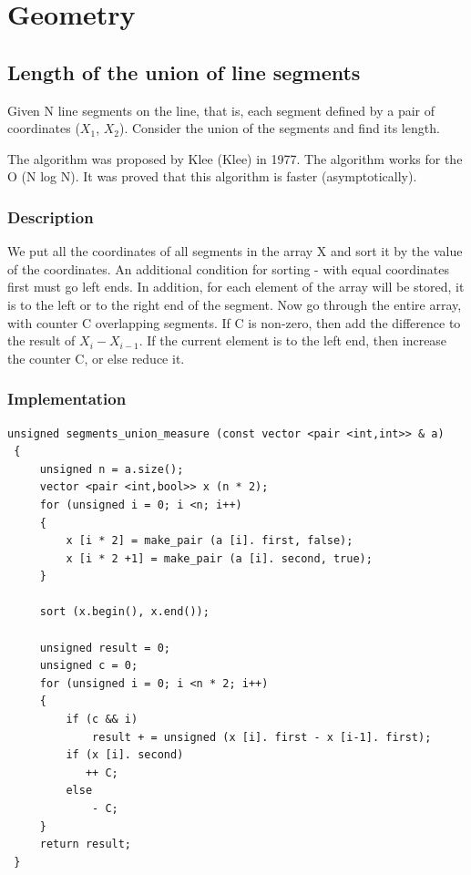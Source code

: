 \chapter{Geometry}

\section{ Length of the union of line segments }
Given N line segments on the line, that is, each segment defined by a pair of coordinates ($X_1$, $X_2$). Consider the union of the segments and find its length.

The algorithm was proposed by Klee (Klee) in 1977. The algorithm works for the O (N log N). It was proved that this algorithm is faster (asymptotically).

\subsection{ Description }
We put all the coordinates of all segments in the array X and sort it by the value of the coordinates. An additional condition for sorting - with equal coordinates first must go left ends. In addition, for each element of the array will be stored, it is to the left or to the right end of the segment. Now go through the entire array, with counter C overlapping segments. If C is non-zero, then add the difference to the result of $X_i - X_{i-1}$. If the current element is to the left end, then increase the counter C, or else reduce it.

\subsection{ Implementation }
\begin{verbatim}
unsigned segments_union_measure (const vector <pair <int,int>> & a)
 {
     unsigned n = a.size();
     vector <pair <int,bool>> x (n * 2);
     for (unsigned i = 0; i <n; i++)
     {
         x [i * 2] = make_pair (a [i]. first, false);
         x [i * 2 +1] = make_pair (a [i]. second, true);
     }

     sort (x.begin(), x.end());

     unsigned result = 0;
     unsigned c = 0;
     for (unsigned i = 0; i <n * 2; i++)
     {
         if (c && i)
             result + = unsigned (x [i]. first - x [i-1]. first);
         if (x [i]. second)
            ++ C;
         else
             - C;
     }
     return result;
 } 
\end{verbatim}
